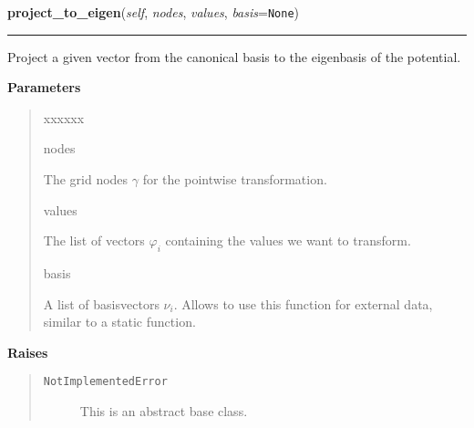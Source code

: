 \hspace{.8\funcindent}\begin{boxedminipage}{\funcwidth}

    \raggedright \textbf{project\_to\_eigen}(\textit{self}, \textit{nodes}, \textit{values}, \textit{basis}={\tt None})

    \vspace{-1.5ex}

    \rule{\textwidth}{0.5\fboxrule}
\setlength{\parskip}{2ex}
    Project a given vector from the canonical basis to the eigenbasis of
    the potential.

\setlength{\parskip}{1ex}
      \textbf{Parameters}
      \vspace{-1ex}

      \begin{quote}
        \begin{Ventry}{xxxxxx}

          \item[nodes]

          The grid nodes $\gamma$ for the pointwise
          transformation.

          \item[values]

          The list of vectors $\varphi_i$ containing the
          values we want to transform.

          \item[basis]

          A list of basisvectors $\nu_i$. Allows to use this function for
          external data, similar to a static function.

        \end{Ventry}

      \end{quote}

      \textbf{Raises}
    \vspace{-1ex}

      \begin{quote}
        \begin{description}

          \item[\texttt{NotImplementedError}]

          This is an abstract base class.

        \end{description}

      \end{quote}

    \end{boxedminipage}

